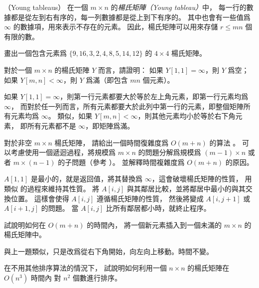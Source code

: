 \startPROBLEM
（Young tableaus）
在一個 $m\times n$ 的\emph{楊氏矩陣（Young tableau）}中，
每一行的數據都是從左到右有序的，每一列數據都是從上到下有序的。
其中也會有一些值爲 $\infty$ 的數據項，用來表示不存在的元素。
因此，楊氏矩陣可以用來存儲 $r\le mn$ 個有限的數。


\startigBase[a]\startitem
畫出一個包含元素爲 $\{9, 16, 3, 2, 4, 8, 5, 14, 12\}$ 的 $4\times 4$ 楊氏矩陣。
\stopitem\stopigBase

\startANSWER
\startformula\startpmatrix%
    \NR
{}   \NC \infty \NR
{}  \NC \infty \NC \infty \NR
\NC \infty \NC \infty \NC \infty \NC \infty \NR
\stoppmatrix\stopformula
\stopANSWER

\startigBase[continue]\startitem
對於一個 $m\times n$ 的楊氏矩陣 $Y$ 而言，請證明：
如果 $Y[1,1]=\infty$，則 $Y$ 爲空；
如果 $Y[m,n]<\infty$，則 $Y$ 爲滿（即包含 $mn$ 個元素）。
\stopitem\stopigBase

\startANSWER
如果 $Y[1,1]=\infty$，則第一行元素都要大於等於左上角元素，即第一行元素均爲 $\infty$，
而對於任一列而言，所有元素都要大於此列中第一行的元素，即整個矩陣所有元素均爲 $\infty$。
類似，如果 $Y[m,n]<\infty$，則其他元素均小於等於右下角元素，
即所有元素都不是 $\infty$，即矩陣爲滿。
\stopANSWER

\startigBase[continue]\startitem
對於非空 $m\times n$ 楊氏矩陣，
請給出一個時間復雜度爲 $O(m+n)$ 的算法 。
可以考慮使用一個遞迴過程，將規模爲 $m\times n$ 的問題分解爲規模爲 $(m-1)\times n$ 或
者 $m\times(n-1)$ 的子問題（\hint 參考 ）。
並解釋時間複雜度爲 $O(m+n)$ 的原因。
\stopitem\stopigBase

\startANSWER
$A[1,1]$ 是最小的，就是返回值，將其替換爲 $\infty$，這會破壞楊氏矩陣的性質，
用類似  的過程來維持其性質。
將 $A[i,j]$ 與其鄰居比較，並將鄰居中最小的與其交換位置。
這樣會使得 $A[i,j]$ 遵循楊氏矩陣的性質，
然後將變成 $A[i,j+1]$ 或 $A[i+1,j]$ 的問題。
當 $A[i,j]$ 比所有鄰居都小時，就終止程序。
\stopANSWER

\startigBase[continue]\startitem
試說明如何在 $O(m+n)$ 的時間內，
將一個新元素插入到一個未滿的 $m\times n$ 的楊氏矩陣中。
\stopitem\stopigBase

\startANSWER
與上一題類似，只是改爲從右下角開始，向左向上移動。時間不變。
\stopANSWER

\startigBase[continue]\startitem
在不用其他排序算法的情況下，
試說明如何利用一個 $n\times n$ 的楊氏矩陣在 $O(n^3)$ 時間內
對 $n^2$ 個數進行排序。
\stopitem\stopigBase

